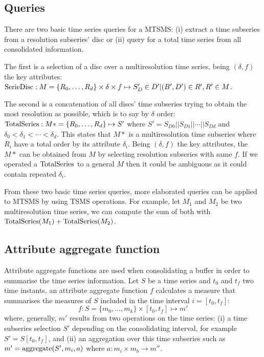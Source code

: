 \subsection{Queries}


There are two basic time series queries for a MTSMS: (i) extract a
time subseries from a resolution subseries' disc or (ii) query for a
total time series from all consolidated information.

The first is a selection of a disc over a multiresolution time series,
being $(\delta,f)$ the key attributes: $\operatorname{SerieDisc}: M=\{R_0, \dots,
R_d\} \times \delta \times f \mapsto S'_D \in D' | (B',D') \in R',R' \in
M$.

The second is a concatenation of all discs' time subseries trying to
obtain the most resolution as possible, which is to say by $\delta$
order: $\operatorname{TotalSeries}: M*=\{R_0, \dots, R_d\} \mapsto S'$ where $S' =
S_{D0} || S_{D1} || \cdots || S_{Dd}$ and $\delta_0 < \delta_1 <
\cdots < \delta_d$. This states that $M*$ is a multiresolution time
subseries where $R_i$ have a total order by its attribute
$\delta_i$. Being $(\delta,f)$ the key attributes, the $M*$ can
be obtained from $M$ by selecting resolution subseries with same $f$. If we
operated a $\operatorname{TotalSeries}$ to a general $M$ then it could be ambiguous
as it could contain repeated $\delta_i$.


From these two basic time series queries, more elaborated queries can
be applied to MTSMS by using TSMS operations. For example, let $M_1$
and $M_2$ be two multiresolution time series, we can compute the sum
of both with $\operatorname{TotalSeries}(M_1) + \operatorname{TotalSeries}(M_2)$. 





\subsection{Attribute aggregate function}
\label{sec:model:interpolador}

Attribute aggregate functions are used when consolidating a buffer in
order to summarise the time series information. Let $S$ be a time
series and $t_0$ and $t_f$ two time instants, an attribute aggregate
function $f$ calculates a measure that summarises the measures of $S$
included in the time interval $i=[t_0,t_f]$:
\[
f : S=\{m_0,\ldots,m_k\} \times [t_0,t_f] \mapsto m'
\]
where, generally, $m'$ results from two operations on the time series:
(i) a time subseries selection $S'$ depending on the consolidating
interval, for example $S' = S[t_0,t_f]$, and (ii) an aggregation over
this time subseries such as $m' = \operatorname*{aggregate}(S',m_i, a)$ where $a: m_i \times
m_b \rightarrow m''$.  

